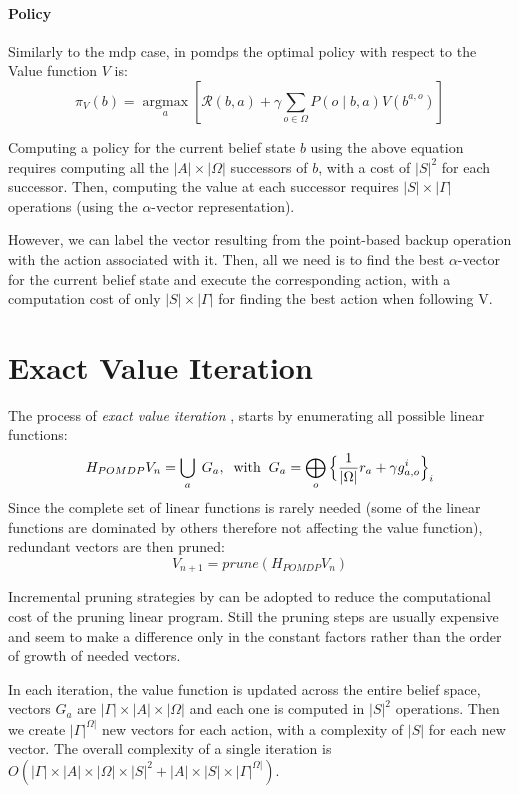 \paragraph{Policy}
Similarly to the \gls{mdp} case, in \glspl{pomdp} the optimal policy with respect to the Value function $V$ is:
$$\pi_{V}(b)=\underset{a}{\operatorname{argmax}} \left[\mathcal{R}(b, a)+\gamma \sum_{o \in \Omega} P\left(o \mid b, a\right) V\left(b^{a, o}\right)\right]$$

Computing a policy for the current belief state \(b\) using the above equation requires computing
all the \(|A| \times|\Omega|\) successors of \(b\), with a cost of \(|S|^{2}\) for each successor. 
Then, computing the value at each successor requires \(|S| \times|\Gamma|\) operations 
(using the \(\alpha\)-vector representation).

However, we can label the vector resulting from the
point-based backup operation with the action associated with it. 
Then, all we need is to find the best $\alpha$-vector for the current
belief state and execute the corresponding action, with a computation cost of only $|S|\times|\Gamma|$ for 
finding the best action when following V.

\section{Exact Value Iteration}
The process of \emph{exact value iteration} \cite{c6635fb4-4e99-3bcb-ba95-fb8ac7476062} \cite{doi:10.1287/mnsc.28.1.1},
starts by enumerating all possible linear functions:
\[
    H_{POMDP}V_{n}=\bigcup_{a}\;G_{a},\;\;\mathrm{with}\;\;G_{a}=\bigoplus_{o}\Big\{\frac{1}{%
    |\Omega|}r_{a}+\gamma g_{a,o}^{i}\Big\}_{i}  
\]
Since the complete set of linear functions is rarely needed (some of the linear functions are 
dominated by others therefore not affecting the value function), redundant vectors are then pruned:
$$V_{n+1} = prune(H_{POMDP}V_n)$$

Incremental pruning strategies by \cite{10.5555/2074226.2074233} can be adopted to reduce the computational 
cost of the pruning linear program. Still the pruning steps are usually expensive and seem to make a difference
only in the constant factors rather than the order of growth of needed vectors.
    
In each iteration, the value function is updated across the entire belief space, vectors $G_a$ 
are $|\Gamma| \times |A| \times |\Omega|$ and each one is computed in $|S|^2$ operations. Then we 
create \(|\Gamma|^{\Omega|}\) new vectors for each action, with a complexity of \(|S|\) for each new 
vector. The overall complexity of a single iteration is \(O\left(|\Gamma| \times|A| \times|\Omega| \times|S|^{2}+|A| \times|S| \times|\Gamma|^{\Omega|}\right)\).

